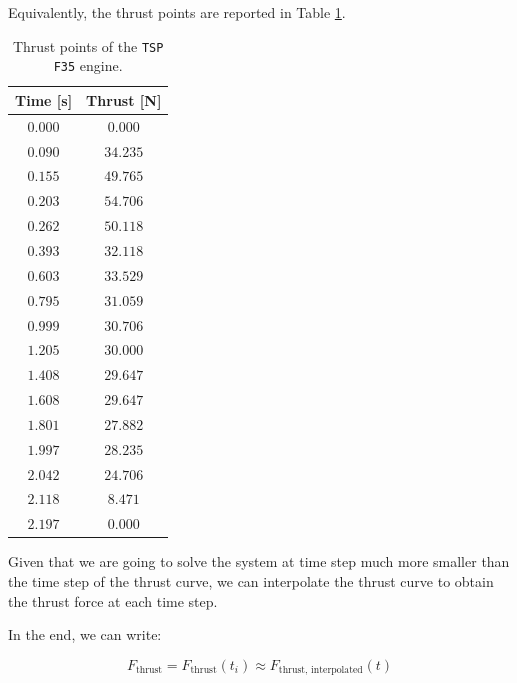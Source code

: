 Equivalently, the thrust points are reported in Table \ref{tab:thrust_points}.

\begin{table}[H]
    \centering
    \begin{tabular}{|c|c|}
        \hline
        \textbf{Time [s]} & \textbf{Thrust [N]} \\
        \hline
        $0.000$           & $0.000$             \\
        $0.090$           & $34.235$            \\
        $0.155$           & $49.765$            \\
        $0.203$           & $54.706$            \\
        $0.262$           & $50.118$            \\
        $0.393$           & $32.118$            \\
        $0.603$           & $33.529$            \\
        $0.795$           & $31.059$            \\
        $0.999$           & $30.706$            \\
        $1.205$           & $30.000$            \\
        $1.408$           & $29.647$            \\
        $1.608$           & $29.647$            \\
        $1.801$           & $27.882$            \\
        $1.997$           & $28.235$            \\
        $2.042$           & $24.706$            \\
        $2.118$           & $8.471$             \\
        $2.197$           & $0.000$             \\
        \hline
    \end{tabular}
    \caption{Thrust points of the \texttt{TSP F35} engine.}
    \label{tab:thrust_points}
\end{table}

Given that we are going to solve the system at time step much more smaller than the time step of the thrust curve, we can interpolate the thrust curve to obtain the thrust force at each time step.

In the end, we can write:

\begin{equation}
    F_{\text{thrust}} = F_{\text{thrust}}(t_i) \approx F_{\text{thrust, interpolated}}(t)
\end{equation}


